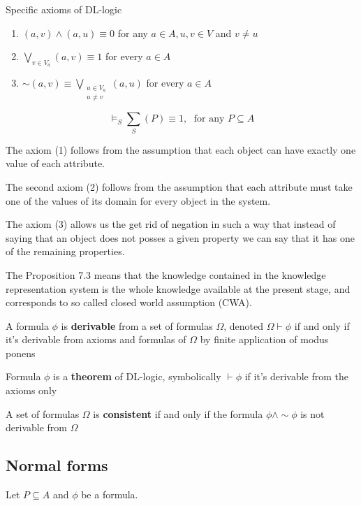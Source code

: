 \documentclass[11pt]{article}
\begin{document}
Specific axioms of DL-logic
\begin{enumerate}
\item \((a,v)\wedge(a,u)\equiv 0\) for any \(a\in A,u,v\in V\) and \(v\neq u\)
\item \(\displaystyle\bigvee_{v\in V_a}(a,v)\equiv 1\) for every \(a\in A\)
\item \(\sim(a,v)\equiv\displaystyle\bigvee_{\substack{u\in V_a\\ u\neq v}}(a,u)\) for every
\(a\in A\)
\end{enumerate}


\begin{proposition}[7.3]
\begin{equation*}
\models_S \displaystyle\sum_{S}(P)\equiv 1,\;\text{ for any } 
P\subseteq A
\end{equation*}
\end{proposition}

The axiom (1) follows from the assumption that each object can have exactly
one value of each attribute.

The second axiom (2) follows from the assumption that each attribute must
take one of the values of its domain for every object in the system. 

The axiom (3) allows us the get rid of negation in such a way that instead of
saying that an object does not posses a given property we can say that it has
one of the remaining properties.

The Proposition 7.3 means that the knowledge contained in the knowledge
representation system is the whole knowledge available at the present stage,
and corresponds to so called closed world assumption (CWA).


A formula \(\phi\) is \textbf{derivable} from a set of formulas \(\Omega\), denoted \(\Omega\vdash\phi\) if
and only if it's derivable from axioms and formulas of \(\Omega\) by finite
application of modus ponens

Formula \(\phi\) is a \textbf{theorem} of DL-logic, symbolically \(\vdash \phi\) if it's derivable
from the axioms only


A set of formulas \(\Omega\) is \textbf{consistent} if and only if the formula \(\phi\wedge\sim\phi\) is not
derivable from \(\Omega\)
\subsection{Normal forms}
\label{sec:org73a3d67}
Let \(P\subseteq A\) and \(\phi\) be a formula.
\end{document}
